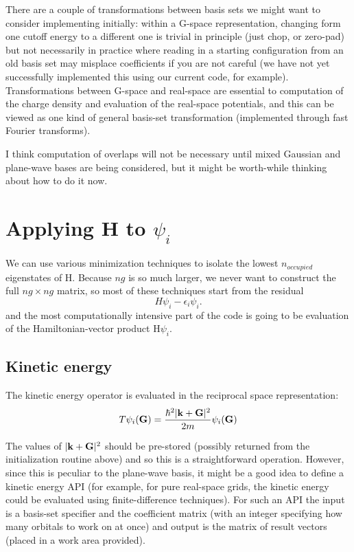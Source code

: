 There are a couple of transformations between basis sets we
might want to consider implementing initially: within a G-space
representation, changing form one cutoff energy to a different
one is trivial in principle (just chop, or zero-pad) but
not necessarily in practice where reading in a starting configuration
from an old basis set may misplace coefficients if you are not
careful (we have not yet successfully implemented this using
our current code, for example). Transformations between G-space and
real-space are essential to computation of the charge density and
evaluation of the real-space potentials, and this can be viewed
as one kind of general basis-set transformation (implemented
through fast Fourier transforms).

I think computation of overlaps will not be necessary until
mixed Gaussian and plane-wave bases are being considered, but
it might be worth-while thinking about how to do it now.

\section{Applying H to $\psi_i$}

We can use various minimization techniques to isolate the
lowest $n_{occupied}$ eigenstates of H. Because $ng$ is so much
larger, we never want to construct the full $ng\times ng$ matrix,
so most of these techniques start from the residual
\begin{equation}
H \psi_i - \epsilon_i \psi_i.
\end{equation}
and the most computationally intensive part of the code is
going to be evaluation of the Hamiltonian-vector product H$\psi_i$.

\subsection{Kinetic energy}

The kinetic energy operator is evaluated in the reciprocal space
representation:
\begin{equation}
T \psi_i({\bf G}) = {\hbar^2|{\bf k + G}|^2 \over 2m} \psi_i({\bf G})
\end{equation}

The values of $|{\bf k + G}|^2$ should be pre-stored (possibly
returned from the initialization routine above) and so this is
a straightforward operation. However, since this is peculiar to
the plane-wave basis, it might be a good idea to define a kinetic
energy API (for example, for pure real-space grids, the kinetic energy
could be evaluated using finite-difference techniques). For such
an API the input is a basis-set specifier and the coefficient matrix
(with an integer specifying how many orbitals to work on at once)
and output is the matrix of result vectors (placed in a work area provided).

